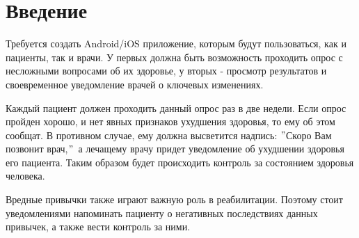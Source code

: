 \section*{Введение}
\label{sec:4}
Требуется создать Android/iOS приложение, которым будут пользоваться, как и пациенты, так и врачи.
У первых должна быть возможность проходить опрос с несложными вопросами об их здоровье, у вторых - просмотр результатов и своевременное уведомление врачей о ключевых изменениях.  \par
Каждый пациент должен проходить данный опрос раз в две недели.
Если опрос пройден хорошо, и нет явных признаков ухудшения здоровья, то ему об этом сообщат.
В противном случае, ему должна высветится надпись: \("\)Скоро Вам позвонит врач,\("\)\, а лечащему врачу придет уведомление об ухудшении здоровья его пациента.
Таким образом будет происходить контроль за состоянием здоровья человека. \par
Вредные привычки также играют важную роль в реабилитации.
Поэтому стоит уведомлениями напоминать пациенту о негативных последствиях данных привычек, а также вести контроль за ними.
